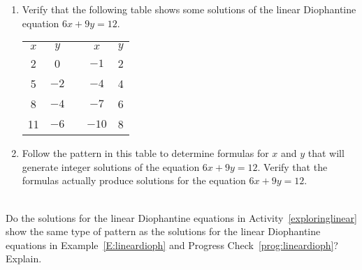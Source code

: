 \begin{prog}\label{prog:lineardioph} \hfill
\begin{enumerate}
\item Verify that the following table shows some solutions of the linear Diophantine equation 
$6x + 9y = 12$.
\begin{center}
\begin{tabular}{c | c  c c | c}
$x$  &  $y$  &  &  $x$  &  $y$ \\ \cline{1-2} \cline{4-5}
2  &  0 &  &  $-1$ &  2 \\
5  &  $-2$ &  &  $-4$ & 4 \\
8  &  $-4$ &  &  $-7$ & 6 \\
11 &  $-6$ &  & $-10$ & 8 \\
\end{tabular}
\end{center}
\item Follow the pattern in this table to determine formulas for $x$ and $y$ that will generate integer solutions of the equation $6x + 9y = 12$. Verify that the formulas actually produce solutions for the equation $6x + 9y = 12$.
\end{enumerate}

\end{prog}

\begin{prog} \label{prog:prevact2} \hfill \\
Do the solutions for the linear Diophantine equations in \typeu Activity~\ref*{exploringlinear} show the same type of pattern as the solutions for the linear Diophantine equations in Example~\ref{E:lineardioph} and Progress Check~\ref{prog:lineardioph}?  Explain.
\end{prog}
\hbreak

